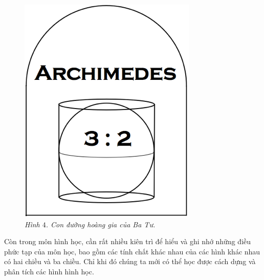 \begin{multicols}{2}
\begin{figure}[H]
		\includegraphics[width= 1\linewidth]{3}
		\caption{\small\textit{\color{quantoan}Hình $4$. Con đường hoàng gia của Ba Tư.}}
		\vspace*{-10pt}
	\end{figure}
	Còn trong môn hình học, cần rất nhiều kiên trì để hiểu và ghi nhớ những điều phức tạp của môn học, bao gồm các tính chất khác nhau của các hình khác nhau có hai chiều và ba chiều. Chỉ khi đó chúng ta mới có thể học được cách dựng và phân tích các hình hình học.
\end{multicols}